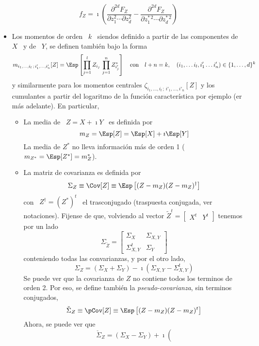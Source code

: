 \begin{itemize}
  \[
  f_Z =  \imath \left( \frac{\partial^{2 d} F_Z}{\partial  z_1^2 \cdots \partial
      z_d^2} -  \frac{\partial^{2 d} F_Z}{\partial z_1^{* \,  2} \cdots \partial
      z_d^{* \, 2}} \right)
  \]
%
\item Los momentos de orden \ $k$ \ siendos definido a partir de las componentes
  de \ $X$ \ y de \ $Y$, se definen tambi\'en bajo la forma
  \[
  m_{i_1  ,  \ldots ,  i_l  \,  ;  \, i'_1  ,  \ldots  , i'_n}[Z]  =  \Esp\left[
    \prod_{j=1}^l Z_{i_j}  \, \prod_{j=1}^n Z_{i'_j}^*  \right] \quad \mbox{con}
  \quad l+n = k, \quad (i_1 , \ldots i_l , i'_1 \ldots i'_n) \in \{ 1 , \ldots , d \}^k
  \]
  y similarmente para los momentos centrales  $\zeta_{i_1 , \ldots , i_l \, ; \,
    i'_1 ,  \ldots ,  i'_n}[Z]$ y los  cumulantes a  partir del logaritmo  de la
  funci\'on caracter\'istica por ejemplo (er m\'as adelante).  En particular,
  \begin{itemize}
  \item La media de \ $Z = X + \imath Y$ \ es definida por
    \[
    m_Z = \Esp[Z] = \Esp[X] + \imath \Esp[Y]
    \]
    La  media de  $Z^*$ no  lleva  informaci\'on m\'as  de orden  1 ($m_{Z^*}  =
    \Esp[Z^*] = m_Z^*$).
  \item La matriz de covarianza es definida por
    \[
    \Sigma_Z \equiv \Cov[Z] \equiv \Esp\left[ (Z-m_Z) (Z-m_Z)^\dag \right]
    \]
    con \  $Z^\dag =  (Z^*)^t$ \ el  trasconjugado (traspuesta  conjugada, ver
    notaciones).    Fijense  de  que,   volviendo  al   vector  $\widetilde{Z}^t
    = \begin{bmatrix} X^t & Y^t \end{bmatrix}$ tenemos por un lado
    \[
    \Sigma_{\widetilde{Z}}  = \begin{bmatrix}
      \Sigma_X & \Sigma_{X,Y}\\ \Sigma_{X,Y}^t & \Sigma_Y\end{bmatrix}
    \]
    conteniendo todas las convarianzas, y por el otro lado,
    \[
    \Sigma_Z =  \left( \Sigma_X  + \Sigma_Y \right)  - \imath \left(  \Sigma_{X,Y} -
      \Sigma_{X,Y}^t \right)
    \]
    Se puede  ver que  la covarianza de  $Z$ no  contiene todos los  terminos de
    orden  2.  Por  eso, se  define  tambi\'en la  {\em pseudo-covarianza},  sin
    terminos conjugados,
    \[
    \check{\Sigma}_Z \equiv \pCov[Z] \equiv \Esp\left[ (Z-m_Z) (Z-m_Z)^t \right]
    \]
    Ahora, se puede ver que
    \[
    \check{\Sigma}_Z  =  \left( \Sigma_X  -  \Sigma_Y  \right)  + \imath  \left(
\]
\end{itemize}
\end{itemize}
